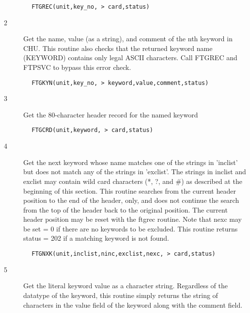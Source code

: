 \documentclass[11pt]{book}
\begin{document}
\begin{verbatim}
        FTGREC(unit,key_no, > card,status)
\end{verbatim}

\begin{description}
\item[2 ] Get the name, value (as a string), and comment of the nth keyword in CHU.
    This routine also checks that the returned keyword name (KEYWORD) contains
    only legal ASCII characters.  Call FTGREC and FTPSVC to bypass this error
   check.
\end{description}

\begin{verbatim}
        FTGKYN(unit,key_no, > keyword,value,comment,status)
\end{verbatim}

\begin{description}
\item[3 ] Get the 80-character header record for the named keyword
\end{description}

\begin{verbatim}
        FTGCRD(unit,keyword, > card,status)
\end{verbatim}

\begin{description}
\item[4 ] Get the next keyword whose name matches one of the strings in
    'inclist' but does not match any of the strings in 'exclist'.
    The strings in inclist and exclist may contain wild card characters
    (*, ?, and \#) as described at the beginning of this section.
    This routine searches from the current header position to the
    end of the header, only, and does not continue the search from
    the top of the header back to the original position.  The current
    header position may be reset with the ftgrec routine.  Note
    that nexc may be set = 0 if there are no keywords to be excluded.
    This routine returns status = 202 if a matching
   keyword is not found.
\end{description}

\begin{verbatim}
        FTGNXK(unit,inclist,ninc,exclist,nexc, > card,status)
\end{verbatim}

\begin{description}
\item[5 ]  Get the literal keyword value as a character string.  Regardless
     of the datatype of the keyword, this routine simply returns the
     string of characters in the value field of the keyword along with
    the comment field.
\end{description}
\end{document}
